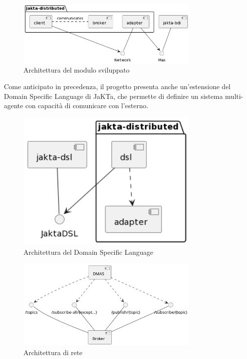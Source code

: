 \begin{figure}[ht]
    \centering
    \includegraphics[width=0.8\textwidth]{figures/detailed-architecture.png}
    \caption{Architettura del modulo sviluppato}
    \label{fig:detailed-architecture}
\end{figure}

Come anticipato in precedenza, il progetto presenta anche un'estensione del Domain Specific Language di JaKTa, che permette di definire un sistema multi-agente con capacità di comunicare con l'esterno.

\begin{figure}[ht]
    \centering
    \includegraphics[width=0.8\textwidth]{figures/dsl-architecture.png}
    \caption{Architettura del Domain Specific Language}
    \label{fig:dmas-architecture}
\end{figure}

\begin{figure}
    \centering
    \includegraphics[width=0.8\textwidth]{figures/network-architecture.png}
    \caption{Architettura di rete}
    \label{fig:network-architecture}
\end{figure}

